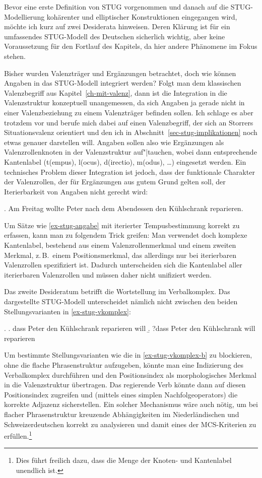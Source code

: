 Bevor eine erste Definition von STUG vorgenommen und danach auf die STUG-Modellierung kohärenter und elliptischer Konstruktionen eingegangen wird, möchte ich kurz auf zwei Desiderata hinweisen. Deren Klärung ist für ein umfassendes STUG-Modell des Deutschen sicherlich wichtig, aber keine Voraussetzung für den Fortlauf des Kapitels, da hier andere Phänomene im Fokus stehen.

Bisher wurden Valenzträger und Ergänzungen betrachtet, doch wie können Angaben in das STUG-Modell integriert werden? Folgt man dem klassischen Valenzbegriff aus Kapitel~\ref{ch-mit-valenz}, dann ist die Integration in die Valenzstruktur konzeptuell unangemessen, da sich Angaben ja gerade nicht in einer Valenzbeziehung zu einem Valenzträger befinden sollen. Ich schlage es aber trotzdem vor und berufe mich dabei auf einen Valenzbegriff, der sich an Storrers Situationsvalenz orientiert und den ich in Abschnitt~\ref{sec-stug-implikationen} noch etwas genauer darstellen will. Angaben sollen also wie Ergänzungen als Valenzrollenknoten in der Valenzstruktur auf"|tauchen, wobei dann entsprechende Kantenlabel ({\sc t(empus)}, {\sc l(ocus)}, {\sc d(irectio)}, {\sc m(odus)}, \ldots) eingesetzt werden. Ein technisches Problem dieser Integration ist jedoch, dass der funktionale Charakter der Valenzrollen, der für Ergänzungen aus gutem Grund gelten soll, der Iterierbarkeit von Angaben nicht gerecht wird:

\ex. \label{ex-stug-angabe} Am Freitag wollte Peter nach dem Abendessen den Kühlschrank reparieren.

Um Sätze wie \ref{ex-stug-angabe} mit iterierter Tempusbestimmung korrekt zu erfassen, kann man zu folgendem Trick greifen: Man verwendet doch komplexe Kantenlabel, bestehend aus einem Valenzrollenmerkmal und einem zweiten  Merkmal, z.\,B.\ einem Positionsmerkmal, das allerdings nur bei iterierbaren Valenzrollen spezifiziert ist. Dadurch unterscheiden sich die Kantenlabel aller iterierbaren Valenzrollen und müssen daher nicht unifiziert werden.      

Das zweite Desideratum betrifft die Wortstellung im Verbalkomplex. Das dargestellte STUG-Modell unterscheidet nämlich nicht zwischen den beiden Stellungsvarianten in \ref{ex-stug-vkomplex}:

\ex. \label{ex-stug-vkomplex}
\a. dass Peter den Kühlschrank reparieren will 
\b. ?dass Peter den Kühlschrank will reparieren\label{ex-stug-vkomplex-b} 

Um bestimmte Stellungsvarianten wie die in \ref{ex-stug-vkomplex-b} zu blockieren, ohne die flache Phrasenstruktur aufzugeben, könnte man eine Indizierung des Verbalkomplex durchführen und den Positionsindex als morphologisches Merkmal in die Valenzstruktur übertragen. Das regierende Verb könnte dann auf diesen Positionsindex zugreifen und (mittels eines simplen Nachfolgeoperators) die korrekte Adjazenz sicherstellen. Ein solcher Mechanismus wäre auch nötig, um bei flacher Phrasenstruktur kreuzende Abhängigkeiten im Niederländischen und Schweizerdeutschen korrekt zu analysieren und damit eines der MCS-Kriterien zu erfüllen.\footnote{Dies führt freilich dazu, dass die Menge der Knoten- und Kantenlabel unendlich ist.}


